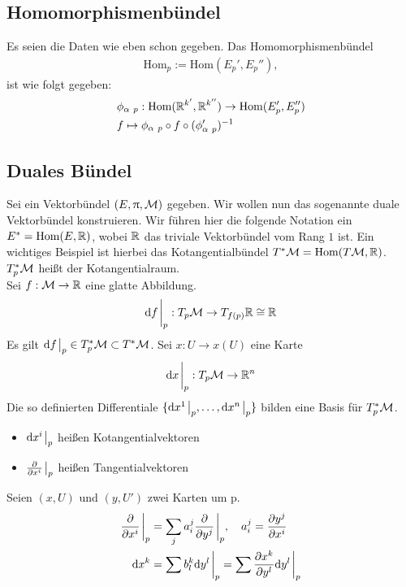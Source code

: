 \subsection{Homomorphismenbündel}
Es seien die Daten wie eben schon gegeben.
Das Homomorphismenbündel
\begin{align}
\mathrm{Hom}_p := \mathrm{Hom}(E_{p}', E_{p}''),
\end{align}
ist wie folgt gegeben:
\begin{align}
&\phi_{\alpha \ p} : \mathrm{Hom}(\mathbb{R}^{k'}, \mathbb{R}^{k''}) \to \mathrm{Hom}(E_{p}', E_{p}'')\\
&f \mapsto \phi_{\alpha \ p} \circ f \circ (\phi_{\alpha \ p}')^{-1}
\end{align}

\subsection{Duales Bündel}
Sei ein Vektorbündel $(E, \uppi, \mathcal{M})$ gegeben. 
Wir wollen nun das sogenannte duale Vektorbündel konstruieren.
Wir führen hier die folgende Notation ein $E^* = \mathrm{Hom}(E, \mathbb{R})$, wobei $\mathbb{R}$ das triviale Vektorbündel vom Rang $1$ ist.
Ein wichtiges Beispiel ist hierbei das Kotangentialbündel $T^{*}\mathcal{M} = \mathrm{Hom}(T\mathcal{M} , \mathbb{R})$.
$T^{*}_{p}\mathcal{M}$ heißt der Kotangentialraum.\\
Sei $f: \mathcal{M} \to \mathbb{R}$ eine glatte Abbildung.
\begin{align}
\dd f \eval_p : T_p \mfk \to T_{f(p)}\R \cong \R
\end{align}
Es gilt $\dd f\eval_p \in T_p^* \mfk \subset T^* \mfk$.
Sei $x: U \to x(U)$ eine Karte 
\begin{align}
\dd x \eval_p : T_p \mfk \to \rn
\end{align}
Die so definierten Differentiale $\{ \dd x^1 \eval_p, \dots , \dd x^n \eval_p \}$ bilden eine Basis für $T_p^* \mathcal{M}$.
\begin{itemize}
\item $\dd x^i \eval_p$ heißen Kotangentialvektoren
\item $\pdv{x^i} \eval_p$ heißen Tangentialvektoren
\end{itemize}
Seien $(x, U)$ und $(y, U')$ zwei Karten um p.
\begin{align}
\pdv{x^i}\eval_p &= \sum_j a^j_i \pdv{y^j} \eval_p, \quad a^j_i = \pdv{y^j}{x^i} \\
\dd x^k &= \sum b^k_l \dd y^l \eval_p = \sum \pdv{x^k}{y^l} \dd y^l \eval_p
\end{align}

